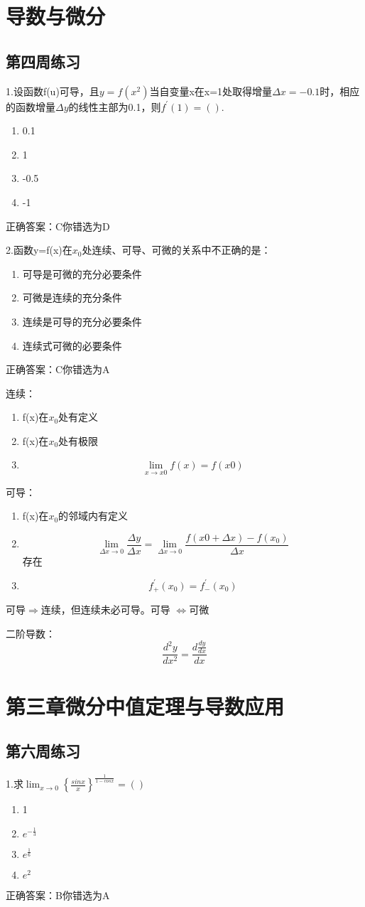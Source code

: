 \documentclass[fleqn]{article}
\begin{document}
\begin{flushleft}
\section{导数与微分}
\subsection{第四周练习}
1.设函数f(u)可导，且$y=f(x^2)$当自变量x在x=1处取得增量$\Delta x=-0.1$时，相应的函数增量$\Delta y$的线性主部为0.1，则$f^{'}(1)=().$
\begin{enumerate}
\item 0.1
\item 1
\item -0.5
\item -1
\end{enumerate}
正确答案：C你错选为D

2.函数y=f(x)在$x_0$处连续、可导、可微的关系中不正确的是：
\begin{enumerate}
\item 可导是可微的充分必要条件
\item 可微是连续的充分条件
\item 连续是可导的充分必要条件
\item 连续式可微的必要条件
\end{enumerate}
正确答案：C你错选为A
\par
连续：
\begin{enumerate}
\item f(x)在$x_0$处有定义
\item f(x)在$x_0$处有极限
\item \[\lim_{x\to x0}f(x)=f(x0)\]
\end{enumerate}
可导：
\begin{enumerate}
\item f(x)在$x_0$的邻域内有定义
\item \[\lim_{\Delta x\to 0}\frac{\Delta y}{\Delta x}=\lim_{\Delta x\to 0}\frac{f(x0+\Delta x)-f(x_0)}{\Delta x}\]存在
\item \[f_{+}^{'}(x_0)=f_{-}^{'}(x_0)\]
\end{enumerate}
可导$\Longrightarrow$连续，但连续未必可导。可导
$\Longleftrightarrow$可微

二阶导数：\[\frac{d^2y}{dx^2}=\frac{d\frac{dy}{dx}}{dx}\]

\section{第三章微分中值定理与导数应用}
\subsection{第六周练习}
1.求$\lim_{x\to 0}\left\lbrace\frac{sinx}{x}\right\rbrace^\frac{1}{1-cosx}=()$
\begin{enumerate}
\item 1
\item $e^{-\frac{1}{3}}$
\item $e^{\frac{1}{6}}$
\item $e^2$
\end{enumerate}
正确答案：B你错选为A

\end{flushleft}
\end{document}
